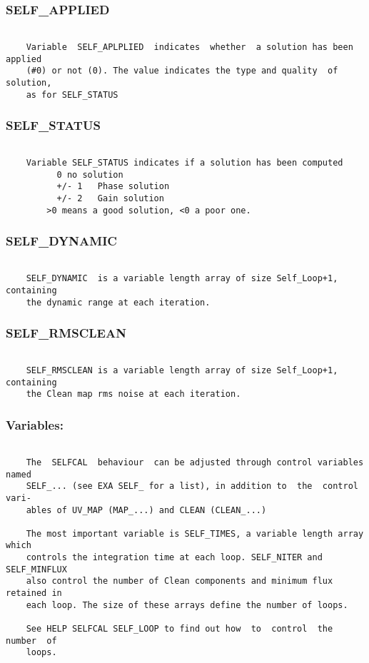 \subsubsection{SELF\_APPLIED}
\begin{verbatim}

    Variable  SELF_APLPLIED  indicates  whether  a solution has been applied
    (#0) or not (0). The value indicates the type and quality  of  solution,
    as for SELF_STATUS

\end{verbatim}
\subsubsection{SELF\_STATUS}
\begin{verbatim}

    Variable SELF_STATUS indicates if a solution has been computed
          0 no solution
          +/- 1   Phase solution
          +/- 2   Gain solution
        >0 means a good solution, <0 a poor one.
\end{verbatim}
\subsubsection{SELF\_DYNAMIC}
\begin{verbatim}

    SELF_DYNAMIC  is a variable length array of size Self_Loop+1, containing
    the dynamic range at each iteration.

\end{verbatim}
\subsubsection{SELF\_RMSCLEAN}
\begin{verbatim}

    SELF_RMSCLEAN is a variable length array of size Self_Loop+1, containing
    the Clean map rms noise at each iteration.

\end{verbatim}
\subsubsection{Variables:}
\begin{verbatim}

    The  SELFCAL  behaviour  can be adjusted through control variables named
    SELF_... (see EXA SELF_ for a list), in addition to  the  control  vari-
    ables of UV_MAP (MAP_...) and CLEAN (CLEAN_...)

    The most important variable is SELF_TIMES, a variable length array which
    controls the integration time at each loop. SELF_NITER and  SELF_MINFLUX
    also control the number of Clean components and minimum flux retained in
    each loop. The size of these arrays define the number of loops.

    See HELP SELFCAL SELF_LOOP to find out how  to  control  the  number  of
    loops.

\end{verbatim}
